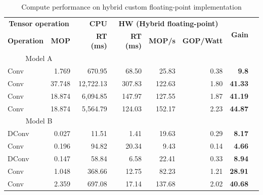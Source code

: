 \begin{table}[!htp]\centering
	\caption{Compute performance on hybrid custom floating-point implementation}\label{tab:performace_float_hybrid }
	\scriptsize
	\begin{tabular}{lrrrrrrr}\toprule
		\multicolumn{2}{c}{\textbf{Tensor operation}} &\textbf{CPU} &\multicolumn{3}{c}{\textbf{HW (Hybrid floating-point)}} &\multirow{2}{*}{\textbf{Gain}} \\\cmidrule{1-6}
		\textbf{Operation} &\textbf{MOP} &\textbf{RT (ms)} &\textbf{RT (ms)} &\textbf{MOP/s} &\textbf{GOP/Watt} & \\\midrule
		\multicolumn{2}{c}{Model A} & & & & & \\
		Conv &1.769 &670.95 &68.50 &25.83 &0.38 &\textbf{9.8} \\
		Conv &37.748 &12,722.13 &307.83 &122.63 &1.80 &\textbf{41.33} \\
		Conv &18.874 &6,094.85 &147.97 &127.55 &1.87 &\textbf{41.19} \\
		Conv &18.874 &5,564.79 &124.03 &152.17 &2.23 &\textbf{44.87} \\
		\multicolumn{2}{c}{Model B} & & & & & \\
		DConv &0.027 &11.51 &1.41 &19.63 &0.29 &\textbf{8.17} \\
		Conv &0.196 &94.82 &20.34 &9.43 &0.14 &\textbf{4.66} \\
		DConv &0.147 &58.84 &6.58 &22.41 &0.33 &\textbf{8.94} \\
		Conv &1.048 &368.66 &12.75 &82.23 &1.21 &\textbf{28.91} \\
		Conv &2.359 &697.08 &17.14 &137.68 &2.02 &\textbf{40.68} \\
		\bottomrule
	\end{tabular}
\end{table}

